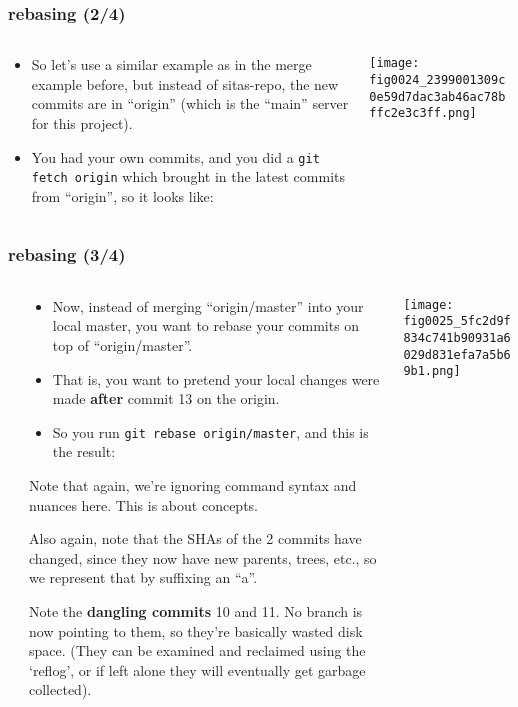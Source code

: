 \documentclass[presentation]{beamer}
\begin{document}
\begin{frame}
\frametitle{rebasing (2/4)}
\label{sec-8-9}
\begin{columns}
\begin{column}{0.6\textwidth}
\label{sec-8-9-1}

\begin{itemize}
\item So let's use a similar example as in the merge example before, but
  instead of sitas-repo, the new commits are in ``origin'' (which is the
  ``main'' server for this project).
\item You had your own commits, and you did a \texttt{git fetch origin} which
  brought in the latest commits from ``origin'', so it looks like:
\end{itemize}
\end{column}
\begin{column}{0.4\textwidth}
\label{sec-8-9-2}


\texttt{[image: fig0024\_2399001309c0e59d7dac3ab46ac78bffc2e3c3ff.png]}
\end{column}
\end{columns}
\end{frame}
\begin{frame}
\frametitle{rebasing (3/4)}
\label{sec-8-10}
\begin{columns} %
\label{sec-8-10-1}
\begin{column}{0.65\textwidth}
\label{sec-8-10-1-1}


\small
\begin{itemize}
\item Now, instead of merging ``origin/master'' into your local master, you want to
  rebase your commits on top of ``origin/master''.
\item That is, you want to pretend
  your local changes were made \textbf{after} commit 13 on the origin.
\item So you run \texttt{git   rebase origin/master}, and this is the result:
\end{itemize}

\tiny

Note that again, we're ignoring command syntax and nuances here.  This is
about concepts.  

Also again, note that the SHAs of the 2 commits have changed,
since they now have new parents, trees, etc., so we represent that by
suffixing an ``a''.

Note the \textbf{dangling commits} 10 and 11.  No branch is now pointing to them, so
they're basically wasted disk space.  (They can be examined and reclaimed
using the `reflog', or if left alone they will eventually get garbage
collected).
\end{column}
\begin{column}{0.35\textwidth}
\label{sec-8-10-1-2}


\texttt{[image: fig0025\_5fc2d9f834c741b90931a6029d831efa7a5b69b1.png]}
\end{column}
\end{columns}
\label{sec-8-10-2}
\end{frame}
\end{document}

